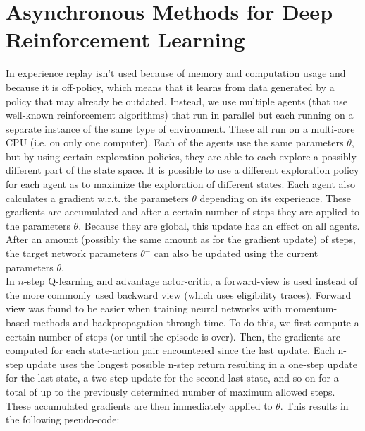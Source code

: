 \documentclass[a4paper]{article}
\begin{document}
\section{Asynchronous Methods for Deep Reinforcement Learning}
In \cite{Mnih2016AsynchronousLearning} experience replay isn't used because of memory and computation usage and because it is off-policy, which means that it learns from data generated by a policy that may already be outdated. Instead, we use multiple agents (that use well-known reinforcement algorithms) that run in parallel but each running on a separate instance of the same type of environment. These all run on a multi-core CPU (i.e. on only one computer). Each of the agents use the same parameters $\theta$, but by using certain exploration policies, they are able to each explore a possibly different part of the state space. It is possible to use a different exploration policy for each agent as to maximize the exploration of different states. Each agent also calculates a gradient w.r.t. the parameters $\theta$ depending on its experience. These gradients are accumulated and after a certain number of steps they are applied to the parameters $\theta$. Because they are global, this update has an effect on all agents. After an amount (possibly the same amount as for the gradient update) of steps, the target network parameters $\theta^{-}$ can also be updated using the current parameters $\theta$.\\
In $n$-step Q-learning and advantage actor-critic, a forward-view is used instead of the more commonly used backward view (which uses eligibility traces). Forward view was found to be easier when training neural networks with momentum-based methods and backpropagation through time. To do this, we first compute a certain number of steps (or until the episode is over). Then, the gradients are computed for each state-action pair encountered since the last update. Each n-step update uses the longest possible n-step return resulting in a one-step update for the last state, a two-step update for the second last state, and so on for a total of up to the previously determined number of maximum allowed steps. These accumulated gradients are then immediately applied to $\theta$. This results in the following pseudo-code:\\
\end{document}

